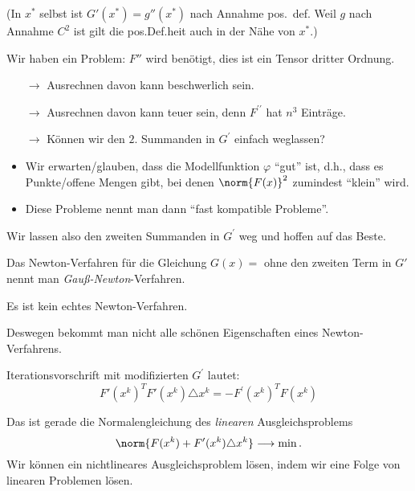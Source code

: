 (In $x^*$ selbst ist $G'(x^*) = g''(x^*)$ nach Annahme pos.\, def.  Weil $g$ nach Annahme $C^2$
ist gilt die pos.Def.heit auch in der Nähe von $x^*$.)

Wir haben ein Problem: $F''$ wird benötigt, dies ist ein Tensor dritter Ordnung.
\begin{itemize}
  \item[$\rightarrow$] Ausrechnen davon kann beschwerlich sein.
  \item[$\rightarrow$] Ausrechnen davon kann teuer sein, denn $F^{\prime \prime}$ hat $n^3$ Einträge.
  \item[$\rightarrow$] Können wir den $2$. Summanden in $G^{\prime}$ einfach weglassen?
\end{itemize}
\begin{itemize}
	\item Wir erwarten/glauben, dass die Modellfunktion $\varphi$ "`gut"' ist,
	  d.h., dass es Punkte/offene Mengen gibt, bei denen $\norm{F(x)}^2$ zumindest "`klein"' wird.
	\item Diese Probleme nennt man dann "`fast kompatible Probleme"'.
\end{itemize}
Wir lassen also den zweiten Summanden in $G^{\prime}$ weg und hoffen auf das Beste.

\begin{definition}
 Das Newton-Verfahren für die Gleichung $G(x) = $ ohne den zweiten Term in $G'$
 nennt man \emph{Gauß-Newton}-Verfahren.
\end{definition}

Es ist kein echtes Newton-Verfahren.

Deswegen bekommt man nicht alle schönen Eigenschaften eines Newton-Verfahrens.

\bigskip

Iterationsvorschrift mit modifizierten $G^{\prime}$ lautet:
\begin{equation}
 \label{eq:gauss_newton_normalengleichung}
  F' (x^k)^T F' (x^k) \triangle x^k = - F^{\prime} (x^k )^T F (x^k )
\end{equation}

Das ist gerade die Normalengleichung des \emph{linearen} Ausgleichsproblems
\begin{equation*}
 \norm{F (x^k ) + F' (x^k) \triangle x^k} \longrightarrow \min.
\end{equation*}
Wir können ein nichtlineares Ausgleichsproblem lösen, indem wir eine Folge von linearen Problemen lösen.

\bigskip

